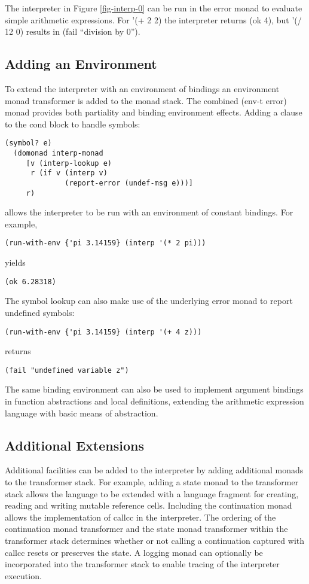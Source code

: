 \documentclass[natbib,10pt]{sigplanconf}
\begin{document}
The interpreter in Figure \ref{fig-interp-0} can be run in the error
monad to evaluate simple arithmetic expressions.  For {\mono '(+ 2 2)}
the interpreter returns {\mono (ok 4)}, but {\mono '(/ 12 0)} results in
{\mono (fail ``division by 0'')}.

\subsection{Adding an Environment}

To extend the interpreter with an environment of bindings an
environment monad transformer is added to the monad stack.  The
combined {\mono (env-t error)} monad provides both partiality and
binding environment effects.  Adding a clause to the {\mono cond} block
to handle symbols:
\begin{verbatim}
(symbol? e)
  (domonad interp-monad
     [v (interp-lookup e)
      r (if v (interp v)
              (report-error (undef-msg e)))]
     r)
\end{verbatim}
allows the interpreter to be run with an environment of constant
bindings.  For example,
\begin{verbatim}
(run-with-env {'pi 3.14159} (interp '(* 2 pi)))
\end{verbatim}
yields
\begin{verbatim}
(ok 6.28318)
\end{verbatim}
The symbol lookup can also make use of the underlying error monad
to report undefined symbols:
\begin{verbatim}
(run-with-env {'pi 3.14159} (interp '(+ 4 z)))
\end{verbatim}
returns
\begin{verbatim}
(fail "undefined variable z")
\end{verbatim}

The same binding environment can also be used to implement argument
bindings in function abstractions and local definitions, extending
the arithmetic expression language with basic means of abstraction.

\subsection{Additional Extensions}

Additional facilities can be added to the interpreter by adding
additional monads to the transformer stack. For example, adding a
state monad to the transformer stack allows the language to be
extended with a language fragment for creating, reading and writing
mutable reference cells. Including the continuation monad allows the
implementation of {\mono callcc} in the interpreter.  The ordering of
the continuation monad transformer and the state monad transformer
within the transformer stack determines whether or not calling a
continuation captured with {\mono callcc} resets or preserves the
state.  A logging monad can optionally be incorporated into the
transformer stack to enable tracing of the interpreter execution.
\end{document}
